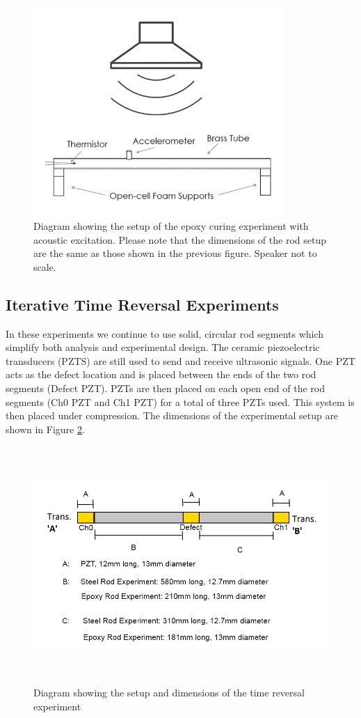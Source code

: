 \documentclass[]{aiaa-tc}%
\begin{document}
\begin{figure}[H]%
\centering
 \includegraphics[height = 8cm]{epoxy_sound}
 \caption{Diagram showing the setup of the epoxy curing experiment with acoustic excitation. Please note that the dimensions of the rod setup are the same as those shown in the previous figure. Speaker not to scale.}
 \label{fig:epoxy_sound}
\end{figure}


\subsection{Iterative Time Reversal Experiments}

In these experiments we continue to use solid, circular rod segments which simplify both analysis and experimental design. The ceramic piezoelectric transducers (PZTS) are still used to send and receive ultrasonic signals. One PZT acts as the defect location and is placed between the ends of the two rod segments (Defect PZT). PZTs are then placed on each open end of the rod segments (Ch0  PZT and Ch1 PZT) for a total of three PZTs used. This system is then placed under compression. The dimensions of the experimental setup are shown in Figure \ref{fig:tr_dimensions}.

\begin{figure}[H]%
\centering
 \includegraphics[height = 9cm]{tr_dimensions}
 \caption{Diagram showing the setup and dimensions of the time reversal experiment}
 \label{fig:tr_dimensions}
\end{figure}
\end{document}
